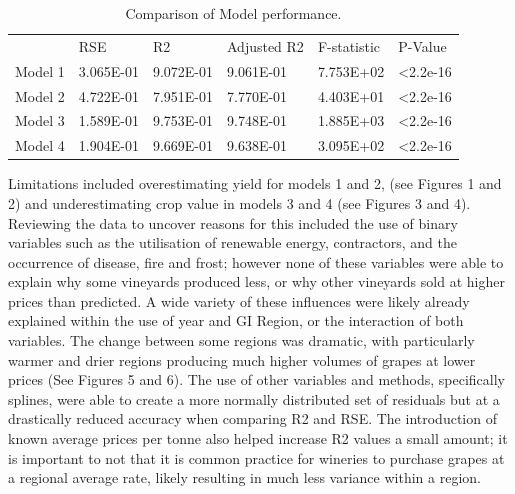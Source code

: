 \documentclass[review,12pt,authoryear]{elsarticle}
\begin{document}
\begin{linenumbers}
\begin{table}[]
  \caption{Comparison of Model performance.}
  \label{tab:tab 11}
  \begin{tabular}{llllll}
          & RSE       & R2        & Adjusted 			R2 & F-statistic & P-Value           \\
  Model 1 & 3.065E-01 & 9.072E-01 & 9.061E-01      & 7.753E+02   & \textless 2.2e-16 \\
  Model 2 & 4.722E-01 & 7.951E-01 & 7.770E-01      & 4.403E+01   & \textless 2.2e-16 \\
  Model 3 & 1.589E-01 & 9.753E-01 & 9.748E-01      & 1.885E+03   & \textless 2.2e-16 \\
  Model 4 & 1.904E-01 & 9.669E-01 & 9.638E-01      & 3.095E+02   & \textless 2.2e-16
  \end{tabular}
\end{table}

Limitations included overestimating yield for models 1 and 2, (see Figures 1 and 2) and underestimating crop value in models 3 and 4 (see Figures 3 and 4).
 Reviewing the data to uncover reasons for this included the use of binary variables such as the utilisation of renewable energy, contractors, and the occurrence of disease, fire and frost; however none of these variables were able to explain why some vineyards produced less, or why other vineyards sold at higher prices than predicted. A wide variety of these influences were likely already explained within the use of year and GI Region, or the interaction of both variables. The change between some regions was dramatic, with particularly warmer and drier regions producing much higher volumes of grapes at lower prices (See Figures 5 and 6). The use of other variables and methods, specifically splines, were able to create a more normally distributed set of residuals but at a drastically reduced accuracy when comparing R2 and RSE. The introduction of known average prices per tonne also helped increase R2 values a small amount; it is important to not that it is common practice for wineries to purchase grapes at a regional average rate, likely resulting in much less variance within a region.


\end{linenumbers}
\end{document}

